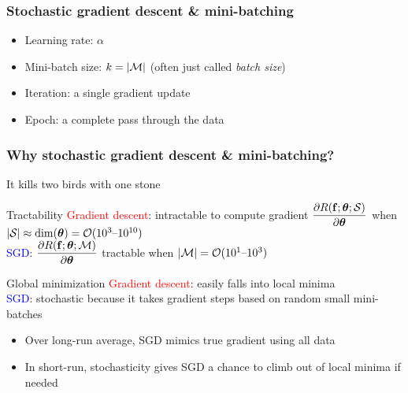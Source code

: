 \begin{frame}
    \frametitle{Stochastic gradient descent \& mini-batching}
    \begin{algorithmic}[1]
        \ENDFOR
    \end{algorithmic}
    \vspace{1ex}

    \begin{itemize}[<.->]
        \item \alert{Learning rate}: $\alpha$
        \item \alert{Mini-batch size}: $k = |\mathcal{M}|$ (often just called \emph{batch size})
        \item \alert{Iteration}: a single gradient update
        \item \alert{Epoch}: a complete pass through the data
    \end{itemize}
\end{frame}

\begin{frame}
    \frametitle{Why stochastic gradient descent \& mini-batching?}
    It kills two birds with one stone

    \begin{block}{Tractability}
        \textcolor{red}{Gradient descent}: intractable to compute gradient $\dfrac{\partial R(\mathbf{f}; \bm{\theta}; \mathcal{S})}{\partial \bm{\theta}}$ when $|\mathcal{S}| \approx \dim(\bm{\theta}) = \mathcal{O}(10^3 \text{--} 10^{10})$ \\[1ex]
        \textcolor{blue}{SGD}: $\dfrac{\partial R(\mathbf{f}; \bm{\theta}; \mathcal{M})}{\partial \bm{\theta}}$ tractable when $|\mathcal{M}| = \mathcal{O}(10^1 \text{--} 10^3)$
    \end{block}
    \pause

    \begin{block}{Global minimization}
        \textcolor{red}{Gradient descent}: easily falls into local minima \\[1ex]
        \textcolor{blue}{SGD}: stochastic because it takes gradient steps based on random small mini-batches
        \begin{itemize}
            \item Over long-run average, SGD mimics true gradient using all data
            \item In short-run, stochasticity gives SGD a chance to climb out of local minima if needed
        \end{itemize}
    \end{block}
\end{frame}

